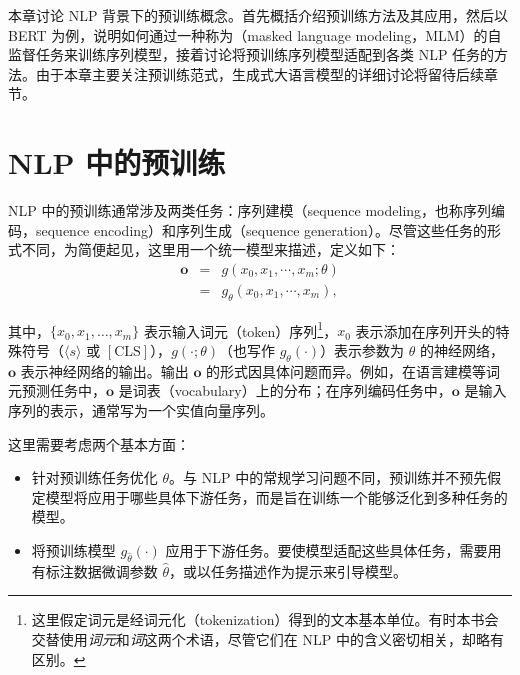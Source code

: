 本章讨论 NLP 背景下的预训练概念。首先概括介绍预训练方法及其应用，然后以 BERT 为例，说明如何通过一种称为（masked language modeling，MLM）的自监督任务来训练序列模型，接着讨论将预训练序列模型适配到各类 NLP 任务的方法。由于本章主要关注预训练范式，生成式大语言模型的详细讨论将留待后续章节。


\section{NLP 中的预训练}

\noindent NLP 中的预训练通常涉及两类任务：序列建模（sequence modeling，也称序列编码，sequence encoding）和序列生成（sequence generation）。尽管这些任务的形式不同，为简便起见，这里用一个统一模型来描述，定义如下：
\begin{eqnarray}
\mathbf{o} & = & g(x_0,x_1,\cdots,x_m;\theta) \nonumber \\
           & = & g_{\theta}(x_0,x_1,\cdots,x_m),
\end{eqnarray}

\noindent 其中，$\{x_0, x_1, \dots, x_m\}$ 表示输入词元（token）序列\footnote{这里假定词元是经词元化（tokenization）得到的文本基本单位。有时本书会交替使用\textit{词元}和\textit{词}这两个术语，尽管它们在 NLP 中的含义密切相关，却略有区别。}，$x_0$ 表示添加在序列开头的特殊符号（$\langle s \rangle$ 或 $\mathbf{[\mathrm{CLS}]}$），$g(\cdot;\theta)$（也写作 $g_{\theta}(\cdot)$）表示参数为 $\theta$ 的神经网络，$\mathbf{o}$ 表示神经网络的输出。输出 $\mathbf{o}$ 的形式因具体问题而异。例如，在语言建模等词元预测任务中，$\mathbf{o}$ 是词表（vocabulary）上的分布；在序列编码任务中，$\mathbf{o}$ 是输入序列的表示，通常写为一个实值向量序列。

这里需要考虑两个基本方面：

\begin{itemize}
\item \vspace{0.5em} 针对预训练任务优化 $\theta$。与 NLP 中的常规学习问题不同，预训练并不预先假定模型将应用于哪些具体下游任务，而是旨在训练一个能够泛化到多种任务的模型。
\item \vspace{0.3em} 将预训练模型 $g_{\hat{\theta}}(\cdot)$ 应用于下游任务。要使模型适配这些具体任务，需要用有标注数据微调参数 $\hat{\theta}$，或以任务描述作为提示来引导模型。
\end{itemize}
\vspace{0.5em}

